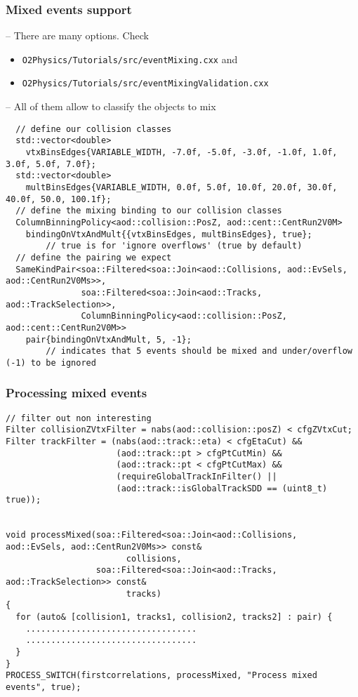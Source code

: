 \documentclass[14pt,aspectratio=169,t]{beamer}
\begin{document}
\begin{frame}[fragile]
  \frametitle{Mixed events support}
  -- {\color{blue} There are many options.} Check 
  \begin{itemize}
    \small
    \item \texttt{O2Physics/Tutorials/src/eventMixing.cxx} and 
    \item \texttt{O2Physics/Tutorials/src/eventMixingValidation.cxx}
  \end{itemize}
  \vspace{0.1in}
  -- {\color{blue}All of them allow to classify the objects to mix}
  \vspace{-0.1in}
  {\scriptsize\color{blue}
  \begin{verbatim}
  // define our collision classes
  std::vector<double> 
    vtxBinsEdges{VARIABLE_WIDTH, -7.0f, -5.0f, -3.0f, -1.0f, 1.0f, 3.0f, 5.0f, 7.0f};
  std::vector<double> 
    multBinsEdges{VARIABLE_WIDTH, 0.0f, 5.0f, 10.0f, 20.0f, 30.0f, 40.0f, 50.0, 100.1f};
  // define the mixing binding to our collision classes
  ColumnBinningPolicy<aod::collision::PosZ, aod::cent::CentRun2V0M> 
    bindingOnVtxAndMult{{vtxBinsEdges, multBinsEdges}, true}; 
        // true is for 'ignore overflows' (true by default)
  // define the pairing we expect
  SameKindPair<soa::Filtered<soa::Join<aod::Collisions, aod::EvSels, aod::CentRun2V0Ms>>, 
               soa::Filtered<soa::Join<aod::Tracks, aod::TrackSelection>>, 
               ColumnBinningPolicy<aod::collision::PosZ, aod::cent::CentRun2V0M>> 
    pair{bindingOnVtxAndMult, 5, -1}; 
        // indicates that 5 events should be mixed and under/overflow (-1) to be ignored
  \end{verbatim}}
\end{frame}

\begin{frame}[fragile]
  \frametitle{Processing mixed events}  
  \vspace{-0.1in}
  {\scriptsize\color{blue}
  \begin{verbatim}
// filter out non interesting
Filter collisionZVtxFilter = nabs(aod::collision::posZ) < cfgZVtxCut;
Filter trackFilter = (nabs(aod::track::eta) < cfgEtaCut) && 
                      (aod::track::pt > cfgPtCutMin) && 
                      (aod::track::pt < cfgPtCutMax) &&
                      (requireGlobalTrackInFilter() || 
                      (aod::track::isGlobalTrackSDD == (uint8_t) true));


void processMixed(soa::Filtered<soa::Join<aod::Collisions, aod::EvSels, aod::CentRun2V0Ms>> const& 
                        collisions,
                  soa::Filtered<soa::Join<aod::Tracks, aod::TrackSelection>> const& 
                        tracks)
{
  for (auto& [collision1, tracks1, collision2, tracks2] : pair) {
    ..................................  
    ..................................
  }
}
PROCESS_SWITCH(firstcorrelations, processMixed, "Process mixed events", true);


  \end{verbatim}}
\end{frame}
\end{document}
